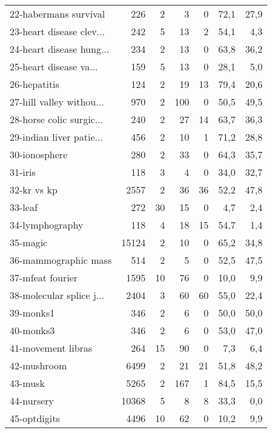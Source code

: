 \begin{table}[h]
\begin{center}
{\begin{tabular}{lr r r r r r}
22-habermans survival & 226 & 2 & 3 & 0 & 72,1 & 27,9\\
23-heart disease clev... & 242 & 5 & 13 & 2 & 54,1 & 4,3\\
24-heart disease hung... & 234 & 2 & 13 & 0 & 63,8 & 36,2\\
25-heart disease va... & 159 & 5 & 13 & 0 & 28,1 & 5,0\\
26-hepatitis & 124 & 2 & 19 & 13 & 79,4 & 20,6\\
27-hill valley withou... & 970 & 2 & 100 & 0 & 50,5 & 49,5\\
28-horse colic surgic... & 240 & 2 & 27 & 14 & 63,7 & 36,3\\
29-indian liver patie... & 456 & 2 & 10 & 1 & 71,2 & 28,8\\
30-ionosphere & 280 & 2 & 33 & 0 & 64,3 & 35,7\\
31-iris & 118 & 3 & 4 & 0 & 34,0 & 32,7\\
32-kr vs kp & 2557 & 2 & 36 & 36 & 52,2 & 47,8\\
33-leaf & 272 & 30 & 15 & 0 & 4,7 & 2,4\\
34-lymphography & 118 & 4 & 18 & 15 & 54,7 & 1,4\\
35-magic & 15124 & 2 & 10 & 0 & 65,2 & 34,8\\
36-mammographic mass & 514 & 2 & 5 & 0 & 52,5 & 47,5\\
37-mfeat fourier & 1595 & 10 & 76 & 0 & 10,0 & 9,9\\
38-molecular splice j... & 2404 & 3 & 60 & 60 & 55,0 & 22,4\\
39-monks1 & 346 & 2 & 6 & 0 & 50,0 & 50,0\\
40-monks3 & 346 & 2 & 6 & 0 & 53,0 & 47,0\\
41-movement libras & 264 & 15 & 90 & 0 & 7,3 & 6,4\\
42-mushroom & 6499 & 2 & 21 & 21 & 51,8 & 48,2\\
43-musk & 5265 & 2 & 167 & 1 & 84,5 & 15,5\\
44-nursery & 10368 & 5 & 8 & 8 & 33,3 & 0,0\\
45-optdigits & 4496 & 10 & 62 & 0 & 10,2 & 9,9\\
\bottomrule
\end{tabular}}
\label{tab:datasetsa}
\end{center}
\end{table}
